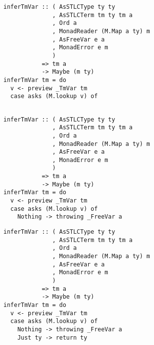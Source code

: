 \documentclass[aspectration=169]{beamer}
\begin{document}
\begin{frame}[fragile]
\begin{overprint}
\begin{verbatim}
  \end{verbatim}  
  \begin{verbatim}
inferTmVar :: ( AsSTLCType ty ty
              , AsSTLCTerm tm ty tm a
              , Ord a
              , MonadReader (M.Map a ty) m
              , AsFreeVar e a
              , MonadError e m
              )
           => tm a
           -> Maybe (m ty)
inferTmVar tm = do
  v <- preview _TmVar tm
  case asks (M.lookup v) of


  \end{verbatim}  
  \begin{verbatim}
inferTmVar :: ( AsSTLCType ty ty
              , AsSTLCTerm tm ty tm a
              , Ord a
              , MonadReader (M.Map a ty) m
              , AsFreeVar e a
              , MonadError e m
              )
           => tm a
           -> Maybe (m ty)
inferTmVar tm = do
  v <- preview _TmVar tm
  case asks (M.lookup v) of
    Nothing -> throwing _FreeVar a 

  \end{verbatim}  
  \begin{verbatim}
inferTmVar :: ( AsSTLCType ty ty
              , AsSTLCTerm tm ty tm a
              , Ord a
              , MonadReader (M.Map a ty) m
              , AsFreeVar e a
              , MonadError e m
              )
           => tm a
           -> Maybe (m ty)
inferTmVar tm = do
  v <- preview _TmVar tm
  case asks (M.lookup v) of
    Nothing -> throwing _FreeVar a 
    Just ty -> return ty
  \end{verbatim}  
  \end{overprint}
\end{frame}
\end{document}
